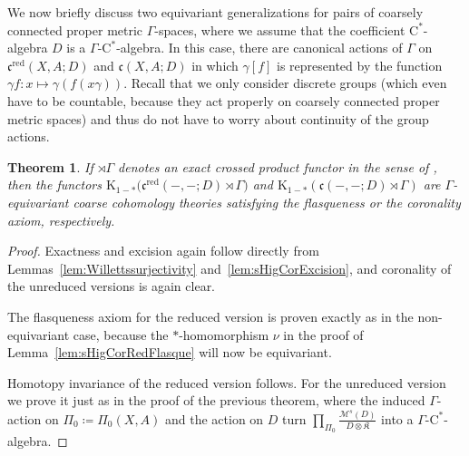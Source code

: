\documentclass[pdftex]{sigma}
\numberwithin{equation}{section}
\newtheorem{thm}{Theorem}[section]
\theoremstyle{definition}
\newcommand{\K}{\mathrm{K}}
\newcommand{\textCstar}{\ensuremath{\mathrm{C}^*\!}}
\newcommand{\sHigCor}{\mathfrak{c}}
\newcommand{\sHigCorRed}{\mathfrak{c}^{\mathrm{red}}}
\newcommand{\Kom}{{\mathfrak{K}}}
\newcommand{\multiplier}{{\mathcal{M}}}
\newcommand{\coarsecomp}{\Pi_0}
\begin{document}
We now briefly discuss two equivariant generalizations for pairs of coarsely connected proper metric $\Gamma$-spaces, where we assume that the coefficient \textCstar-algebra $D$ is a $\Gamma$-\textCstar-algebra. In this case, there are canonical actions of $\Gamma$ on $\sHigCorRed(X,A;D)$ and $\sHigCor(X,A;D)$ in which $\gamma [f]$ is represented by the function $\gamma f\colon x\mapsto \gamma(f(x\gamma))$. Recall that we only consider discrete groups (which even have to be countable, because they act properly on coarsely connected proper metric spaces) and thus do not have to worry about continuity of the group actions.

\begin{thm}If $\rtimes\Gamma$ denotes an exact crossed product functor in the sense of {\rm \cite[Definition~3.1]{BaumGuentnerWillettExpandersExactcrossedproducts}}, then the functors $\K_{1-*}\big(\sHigCorRed(-,-;D)\rtimes \Gamma\big)$ and $\K_{1-*}(\sHigCor(-,-;D)\rtimes\Gamma)$ are $\Gamma$-equivariant coarse cohomology theories satisfying the flasqueness or the coronality axiom, respectively.
\end{thm}
\begin{proof}
Exactness and excision again follow directly from Lemmas~\ref{lem:Willettssurjectivity} and~\ref{lem:sHigCorExcision}, and coronality of the unreduced versions is again clear.

The flasqueness axiom for the reduced version is proven exactly as in the non-equivariant case, because the $*$-homomorphism $\nu$ in the proof of Lemma~\ref{lem:sHigCorRedFlasque} will now be equivariant.

Homotopy invariance of the reduced version follows. For the unreduced version we prove it just as in the proof of the previous theorem, where the induced $\Gamma$-action on $\coarsecomp\coloneqq \coarsecomp(X,A)$ and the action on $D$ turn $\prod_{\coarsecomp}\frac{\multiplier^s(D)}{D\otimes\Kom}$ into a $\Gamma$-\textCstar-algebra.
\end{proof}
\end{document}
